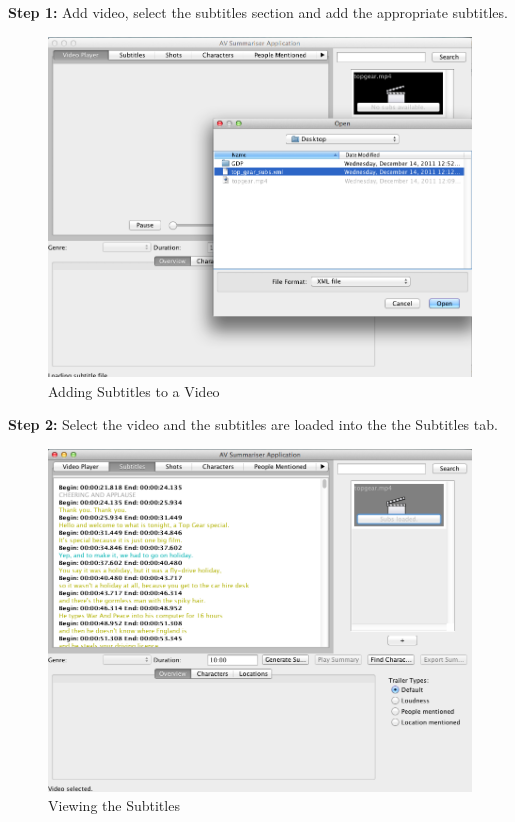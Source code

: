 \textbf{Step 1:} Add video, select the subtitles section and add the appropriate subtitles. 
\begin{figure}[ht]
\begin{center}
 \includegraphics[scale=0.31]{Images/SubtitleWalkthrough1.png}
  \caption{Adding Subtitles to a Video}
 \end{center}
\end{figure}

\textbf{Step 2:} Select the video and the subtitles are loaded into the the Subtitles tab. 
\begin{figure}[ht]
\begin{center}
 \includegraphics[scale=0.31]{Images/SubtitleWalkthrough2.png}
  \caption{Viewing the Subtitles}
 \end{center}
\end{figure}

